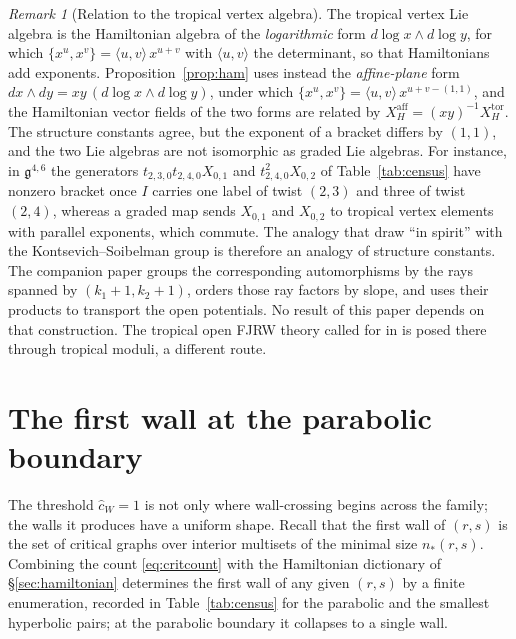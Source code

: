 \documentclass[11pt]{amsart}
\theoremstyle{definition}
\theoremstyle{remark}
\newtheorem{remark}[theorem]{Remark}
\newcommand{\gfrak}{\mathfrak{g}}
\newcommand{\chat}{\hat{c}}
\begin{document}
\begin{remark}[Relation to the tropical vertex algebra]
\label{rem:tropical}
The tropical vertex Lie algebra is the Hamiltonian algebra of the
\emph{logarithmic} form $d\log x\wedge d\log y$, for which
$\{x^{u},x^{v}\}=\langle u,v\rangle\,x^{u+v}$ with $\langle u,v\rangle$ the
determinant, so that Hamiltonians add exponents. Proposition~\ref{prop:ham} uses
instead the \emph{affine-plane} form $dx\wedge dy=xy\,(d\log x\wedge d\log y)$,
under which $\{x^{u},x^{v}\}=\langle u,v\rangle\,x^{u+v-(1,1)}$, and the
Hamiltonian vector fields of the two forms are related by
$X^{\mathrm{aff}}_H=(xy)^{-1}X^{\mathrm{tor}}_H$.  The structure constants
agree, but the exponent of a bracket differs by $(1,1)$, and the two Lie
algebras are not isomorphic as graded Lie algebras.  For instance, in
$\gfrak^{4,6}$ the generators $t_{2,3,0}t_{2,4,0}X_{0,1}$ and
$t_{2,4,0}^2X_{0,2}$ of Table~\ref{tab:census} have nonzero bracket once $I$ carries one label of
twist $(2,3)$ and three of twist $(2,4)$, whereas a graded map sends
$X_{0,1}$ and $X_{0,2}$ to tropical vertex elements with parallel exponents,
which commute.  The analogy that \cite[Remarks~0.8 and~4.20]{GKT} draw
``in spirit'' with the Kontsevich--Soibelman group is therefore an analogy of
structure constants.  The companion paper \cite{companion}
groups the corresponding automorphisms by the rays spanned by
$(k_1+1,k_2+1)$, orders those ray factors by slope, and uses their products to
transport the open potentials.  No result of this paper depends on that
construction.
The tropical open FJRW theory called for in \cite[\S6]{GKTsurvey} is posed
there through tropical moduli, a different route.
\end{remark}

\section{The first wall at the parabolic boundary}
\label{sec:parabolic}

The threshold $\chat_{W}=1$ is not only where wall-crossing begins across the
family; the walls it produces have a uniform shape. Recall that the first
wall of $(r,s)$ is the set of critical graphs over interior multisets of the
minimal size $n_{*}(r,s)$. Combining the count
\eqref{eq:critcount} with the Hamiltonian dictionary of \S\ref{sec:hamiltonian}
determines the first wall of any given $(r,s)$ by a finite enumeration,
recorded in Table~\ref{tab:census} for the parabolic and the smallest
hyperbolic pairs; at the parabolic boundary it collapses to a single wall.
\end{document}
